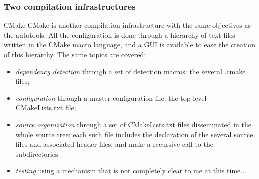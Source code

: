 \documentclass[8pt]{beamer}
\begin{document}
\begin{frame}
  \frametitle{Two compilation infrastructures}
  \begin{block}{CMake}
    CMake is another compilation infrastructure with the same objectives as the autotools. All the configuration is done through a hierarchy of text files written in the CMake macro language, and a GUI is available to ease the creation of this hierarchy. The same topics are covered:
    \begin{itemize}
    \item \emph{dependency detection} through a set of detection macros: the several .cmake files;
    \item \emph{configuration} through a master configuration file: the top-level CMakeLists.txt file;
    \item \emph{source organization} through a set of CMakeLists.txt files disseminated in the whole source tree: each such file includes the declaration of the several source files and associated header files, and make a recursive call to the subdirectories.
    \item \emph{testing} using a mechanism that is not completely clear to me at this time...
    \end{itemize}
  \end{block}
\end{frame}
\end{document}

